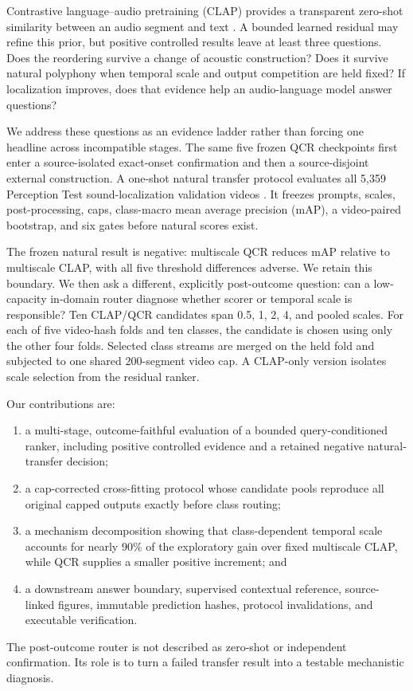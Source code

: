 \documentclass[journal,10pt]{IEEEtran}
\begin{document}
Contrastive language--audio pretraining (CLAP) provides a transparent
zero-shot similarity between an audio segment and text \cite{clap,laionclap}.
A bounded learned residual may refine this prior, but positive controlled
results leave at least three questions. Does the reordering survive a change
of acoustic construction? Does it survive natural polyphony when temporal
scale and output competition are held fixed? If localization improves, does
that evidence help an audio-language model answer questions?

We address these questions as an evidence ladder rather than forcing one
headline across incompatible stages. The same five frozen QCR checkpoints
first enter a source-isolated exact-onset confirmation and then a
source-disjoint external construction. A one-shot natural transfer protocol
evaluates all 5,359 Perception Test sound-localization validation videos
\cite{perceptiontest}. It freezes prompts, scales, post-processing, caps,
class-macro mean average precision (mAP), a video-paired bootstrap, and six
gates before natural scores exist.

The frozen natural result is negative: multiscale QCR reduces mAP relative to
multiscale CLAP, with all five threshold differences adverse. We retain this
boundary. We then ask a different, explicitly post-outcome question: can a
low-capacity in-domain router diagnose whether scorer or temporal scale is
responsible? Ten CLAP/QCR candidates span 0.5, 1, 2, 4, and pooled scales.
For each of five video-hash folds and ten classes, the candidate is chosen
using only the other four folds. Selected class streams are merged on the held
fold and subjected to one shared 200-segment video cap. A CLAP-only version
isolates scale selection from the residual ranker.

Our contributions are:
\begin{enumerate}
  \item a multi-stage, outcome-faithful evaluation of a bounded
  query-conditioned ranker, including positive controlled evidence and a
  retained negative natural-transfer decision;
  \item a cap-corrected cross-fitting protocol whose candidate pools reproduce
  all original capped outputs exactly before class routing;
  \item a mechanism decomposition showing that class-dependent temporal scale
  accounts for nearly 90\% of the exploratory gain over fixed multiscale
  CLAP, while QCR supplies a smaller positive increment; and
  \item a downstream answer boundary, supervised contextual reference,
  source-linked figures, immutable prediction hashes, protocol invalidations,
  and executable verification.
\end{enumerate}
The post-outcome router is not described as zero-shot or independent
confirmation. Its role is to turn a failed transfer result into a testable
mechanistic diagnosis.
\end{document}
